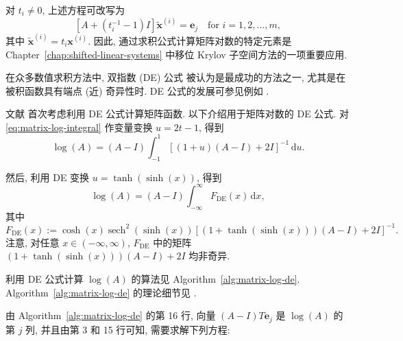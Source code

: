 {对 $t_i\ne0$, 上述方程可改写为}
\begin{equation}\label{eq:matrix-log-shifted-systems}[A+(t_i^{-1}-1)I]\widetilde{\boldsymbol{x}}^{(i)}=\boldsymbol{e}_j\quad\text{for }i=1,2,\ldots,m,\end{equation}
{其中 $\widetilde{\boldsymbol{x}}^{(i)}=t_i\boldsymbol{x}^{(i)}$. 因此, 通过求积公式计算矩阵对数的特定元素是 Chapter~\ref{chap:shifted-linear-systems} 中移位 Krylov 子空间方法的一项重要应用.}

{\leavevmode{}\label{idx:chapter-05-section-06:matrix-logarithm-de-formula-introduction}在众多数值求积方法中, 双指数 (DE) 公式  被认为是最成功的方法之一, 尤其是在被积函数具有端点 (近) 奇异性时. DE 公式的发展可参见例如 .}

{文献  首次考虑利用 DE 公式计算矩阵函数. 以下介绍用于矩阵对数的 DE 公式. 对 \eqref{eq:matrix-log-integral} 作变量变换 $u=2t-1$, 得到}
\begin{equation}\label{eq:matrix-log-symmetric-integral}\log(A)=(A-I)\int_{-1}^1[(1+u)(A-I)+2I]^{-1}\,\mathrm{d}u.\end{equation}

{然后, 利用 DE 变换 $u=\tanh(\sinh(x))$, 得到}
\begin{equation}\label{eq:matrix-log-de-integral}\log(A)=(A-I)\int_{-\infty}^{\infty}F_{\mathrm{DE}}(x)\,\mathrm{d}x,\end{equation}
{其中}
\begin{equation}\label{eq:matrix-log-de-integrand}F_{\mathrm{DE}}(x):=\cosh(x)\operatorname{sech}^2(\sinh(x))[(1+\tanh(\sinh(x)))(A-I)+2I]^{-1}.\end{equation}
{注意, 对任意 $x\in(-\infty,\infty)$, $F_{\mathrm{DE}}$ 中的矩阵 $(1+\tanh(\sinh(x)))(A-I)+2I$ 均非奇异.}

{利用 DE 公式计算 $\log(A)$ 的算法见 Algorithm~\ref{alg:matrix-log-de}. Algorithm~\ref{alg:matrix-log-de} 的理论细节见 .}

{由 Algorithm~\ref{alg:matrix-log-de} 的第 16 行, 向量 $(A-I)T\boldsymbol{e}_j$ 是 $\log(A)$ 的第 $j$ 列, 并且由第 3 和 15 行可知, 需要求解下列方程:}

